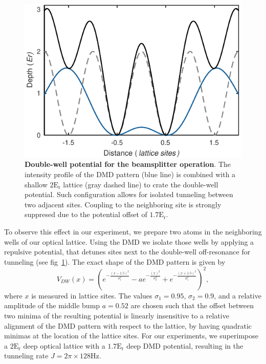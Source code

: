 \begin{figure}[t]
	\centering
	\includegraphics[scale=1]{figures/CBH_DW.pdf}
	\caption{{\bf Double-well potential for the beamsplitter operation}. The intensity profile of the DMD pattern (blue line) is combined with a shallow $2\mathrm{E_r}$ lattice (gray dashed line) to crate the double-well potential. Such configuration allows for isolated tunneling between two adjacent sites. Coupling to the neighboring site is strongly suppresed due to the potential offset of $1.7 \mathrm{E_{r}}. $}
	\label{fig:CBH_DW}
\end{figure}

To observe this effect in our experiment, we prepare two atoms in the neighboring wells of our optical lattice. Using the DMD we isolate those wells by applying a repulsive potential, that detunes sites next to the double-well off-resonance for tunneling (see fig~\ref{fig:CBH_DW}). The exact shape of the DMD pattern is given by
\begin{equation}
V_{DW}(x) = (e^{-\frac{(x-1.5)^2}{\sigma_1^2}} - ae^{-\frac{(x)^2}{\sigma_2^2}} + e^{-\frac{(x+1.5)^2}{\sigma_1^2}})^2,
\end{equation}
where $x$ is measured in lattice sites. The values $\sigma_1 = 0.95$, $\sigma_2 = 0.9$, and a relative amplitude of the middle bump $a=0.52$ are chosen such that the offset between two minima of the resulting potential is linearly insensitive to a relative alignment of the DMD pattern with respect to the lattice, by having quadratic minimas at the location of the lattice sites. For our experiments, we superimpose a $2\mathrm{E_r}$ deep optical lattice with a $1.7\mathrm{E_r}$ deep DMD potential, resulting in the tunneling rate $J = 2 \pi \times 128 \mathrm{Hz}$.


